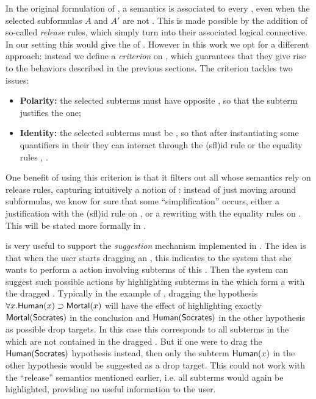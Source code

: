\begin{scope}
In the original formulation of  , a
semantics is associated to every , even when the selected
subformulas $A$ and $A'$ are not . This is made possible by the
addition of so-called \emph{release} rules, which simply turn  into their
associated logical connective. In our setting this would give the 
of . However in this work we opt for a different approach:
instead we define a \emph{ criterion} on , which guarantees that
they give rise to the behaviors described in the previous sections. The
criterion tackles two issues:
\begin{itemize}
  \item \textbf{Polarity:} the selected subterms must have opposite
  \emph{}, so that the \emph{} subterm justifies the
  \emph{} one;
  \item \textbf{Identity:} the selected subterms must be \emph{},
  so that after instantiating some quantifiers in their  they can
  interact through the {\kl(sfl){id}} rule or the equality rules
  {, }.
\end{itemize}
\AP
One benefit of using this criterion is that it filters out all 
whose semantics rely on release rules, capturing intuitively a notion of
: instead of just moving around subformulas, we know for
sure that some ``simplification'' occurs, either a justification with the
{\kl(sfl){id}} rule on , or a rewriting with the equality
rules on . This will be stated more formally in
.

 is very useful to support the \emph{suggestion} mechanism
implemented in . The idea is that when the user starts dragging an
, this indicates to the system that she wants to perform a 
action involving subterms of this . Then the system can suggest such
possible actions by highlighting subterms in the  which form a
  with the dragged . Typically in the example of
, dragging the hypothesis $\forall x. \mbox{\textsf{Human}}(x) \supset
\mbox{\textsf{Mortal}}(x)$ will have the effect of highlighting exactly $\mbox{\textsf{Mortal}}(\mbox{\textsf{Socrates}})$ in
the conclusion and $\mbox{\textsf{Human}}(\mbox{\textsf{Socrates}})$ in the other hypothesis as possible drop
targets. In this case this corresponds to all subterms in the  which
are not contained in the dragged . But if one were to drag the
$\mbox{\textsf{Human}}(\mbox{\textsf{Socrates}})$ hypothesis instead, then only the subterm $\mbox{\textsf{Human}}(x)$ in the
other hypothesis would be suggested as a drop target. This could not work with
the ``release'' semantics mentioned earlier, i.e. all subterms would again be
highlighted, providing no useful information to the user.


\end{scope}

